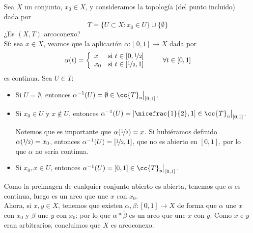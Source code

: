 \begin{ejercicio}
    Sea $X$ un conjunto, $x_0\in X$, y consideramos la topología (del punto incluido) dada por
    \begin{equation*}
        T = \{U\subset X : x_0 \in U\} \cup \{\emptyset \}
    \end{equation*}
    ¿Es $(X,T)$ arcoconexo?\\

    \noindent
    Sí: sea $x\in X$, veamos que la aplicación $\alpha:[0,1]\to X$ dada por
    \begin{equation*}
        \alpha(t) = \left\{\begin{array}{ll}
                x & \text{si } t\in [0,\nicefrac{1}{2}] \\
                x_0 & \text{si } t\in \left]\nicefrac{1}{2},1\right]
        \end{array}\right. \qquad \forall t\in [0,1]
    \end{equation*}
    es continua. Sea $U\in T$:
    \begin{itemize}
        \item Si $U = \emptyset $, entonces $\alpha^{-1}(U) = \emptyset \in \cc{T}_u\big|_{[0,1]}$.
        \item Si $x_0\in U$ y $x\notin U$, entonces $\alpha^{-1}(U) = \left]\nicefrac{1}{2},1\right]\in \cc{T}_u\big|_{[0,1]}$.
        
        Notemos que es importante que $\alpha(\nicefrac{1}{2}) = x$. Si hubiéramos definido $\alpha(\nicefrac{1}{2}) = x_0$, entonces $\alpha^{-1}(U) = \left[\nicefrac{1}{2},1\right]$, que no es abierto en $[0,1]$, por lo que $\alpha$ no sería continua.
        \item Si $x_0,x\in U$, entonces $\alpha^{-1}(U) = [0,1] \in \cc{T}_u\big|_{[0,1]}$.
    \end{itemize}
    Como la preimagen de cualquier conjunto abierto es abierta, tenemos que $\alpha$ es continua, luego es un arco que une $x$ con $x_0$.\\

    \noindent
    Ahora, si $x,y\in X$, tenemos que existen $\alpha,\beta:[0,1]\to X$ de forma que $\alpha$ une $x$ con $x_0$ y $\beta$ une $y$ con $x_0$; por lo que $\alpha\ast\tilde{\beta}$ es un arco que une $x$ con $y$. Como $x$ e $y$ eran arbitrarios, concluimos que $X$ es arcoconexo.
\end{ejercicio}

